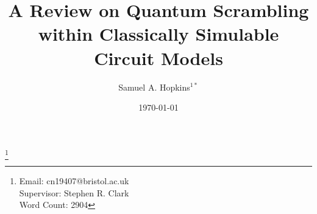 \documentclass[twocolumn, aps, nobalancelastpage]{revtex4-2}
\begin{document}
\title{A Review on Quantum Scrambling within Classically Simulable Circuit Models}

\author{Samuel A. Hopkins$^{1*}$}
\date{\today}
\thanks{Email: cn19407@bristol.ac.uk\\
Supervisor: Stephen R. Clark\\
Word Count: 2904
}



% 
\maketitle

\tableofcontents











\end{document}
